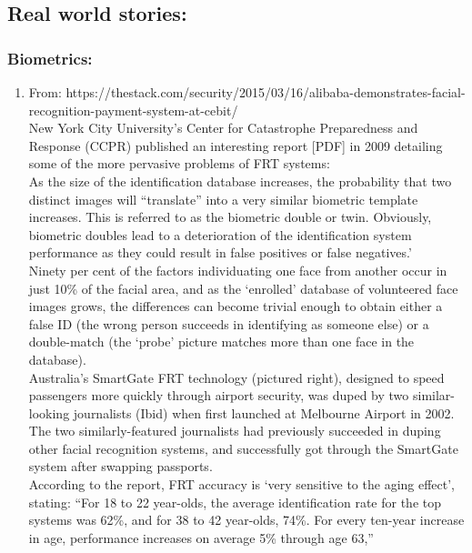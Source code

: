 \documentclass[11pt]{article}
\begin{document}
\subsection*{Real world stories:}

\subsubsection*{Biometrics:}
\begin{enumerate}
 \item From: https://thestack.com/security/2015/03/16/alibaba-demonstrates-facial-recognition-payment-system-at-cebit/\\
 New York City University’s Center for Catastrophe Preparedness and Response (CCPR) published an interesting report [PDF] in 2009 detailing some of 
the more pervasive problems of FRT systems:\\
As the size of the identification database increases, the probability that two distinct images will “translate” into a very similar biometric template 
increases. This is referred to as the biometric double or twin. Obviously, biometric doubles lead to a deterioration of the identification system 
performance as they could result in false positives or false negatives.’\\

Ninety per cent of the factors individuating one face from another occur in just 10\% of the facial area, and as the ‘enrolled’ database of 
volunteered face images grows, the differences can become trivial enough to obtain either a false ID (the wrong person succeeds in identifying as 
someone else) or a double-match (the ‘probe’ picture matches more than one face in the database).\\

Australia’s SmartGate FRT technology (pictured right), designed to speed passengers more quickly through airport security, was duped by two 
similar-looking journalists (Ibid) when first launched at Melbourne Airport in 2002. The two similarly-featured journalists had previously succeeded 
in duping other facial recognition systems, and successfully got through the SmartGate system after swapping passports.\\

According to the report, FRT accuracy is ‘very sensitive to the aging effect’, stating: “For 18 to 22 year-olds, the average identification rate for 
the top systems was 62\%, and for 38 to 42 year-olds, 74\%. For every ten-year increase in age, performance increases on average 5\% through age 63,”
\end{enumerate}
\end{document}

